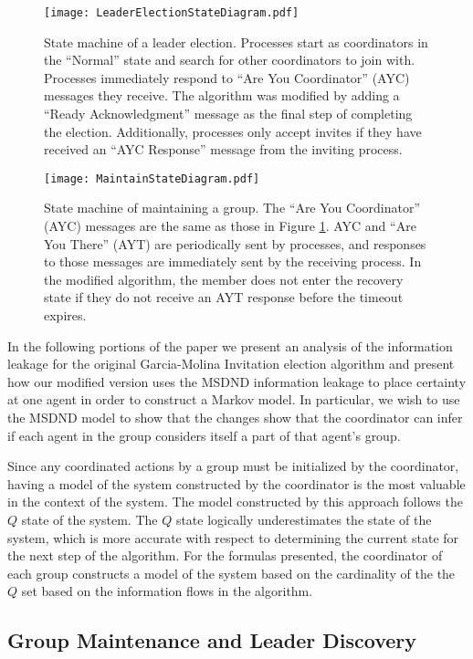 \begin{figure}[!t]
\texttt{[image: LeaderElectionStateDiagram.pdf]}
\caption{State machine of a leader election. Processes start as coordinators in the ``Normal'' state and search for other coordinators to join with. Processes immediately respond to ``Are You Coordinator'' (AYC) messages they receive. The algorithm was modified by adding a ``Ready Acknowledgment'' message as the final step of completing the election. Additionally, processes only accept invites if they have received an ``AYC Response'' message from the inviting process.}
\label{fig:statemachine}
\end{figure}

\begin{figure}[!t]
\texttt{[image: MaintainStateDiagram.pdf]}
\caption{State machine of maintaining a group. The ``Are You Coordinator'' (AYC) messages are the same as those in Figure \ref{fig:statemachine}. AYC and ``Are You There'' (AYT) are periodically sent by processes, and responses to those messages are immediately sent by the receiving process. In the modified algorithm, the member does not enter the recovery state if they do not receive an AYT response before the timeout expires.}
\label{fig:statemachine2}
\end{figure}


In the following portions of the paper we present an analysis of the information leakage for the original Garcia-Molina Invitation election algorithm and present how our modified version uses the MSDND information leakage to place certainty at one agent in order to construct a Markov model. In particular, we wish to use the MSDND model to show that the changes show that the coordinator can infer if each agent in the group considers itself a part of that agent's group.

Since any coordinated actions by a group must be initialized by the coordinator, having a model of the system constructed by the coordinator is the most valuable in the context of the system. The model constructed by this approach follows the $Q$ state of the system. The $Q$ state logically underestimates the state of the system, which is more accurate with respect to determining the current state for the next step of the algorithm. For the formulas presented, the coordinator of each group constructs a model of the system based on the cardinality of the the $Q$ set based on the information flows in the algorithm.

\subsection{Group Maintenance and Leader Discovery}

